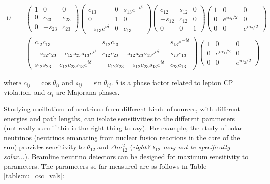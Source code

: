 \begin{equation}
\begin{aligned}
U &= \begin{pmatrix}
1 & 0 & 0 \\
0 & c_{23} & s_{23} \\
0 & -s_{23} & c_{23} \end{pmatrix}
\begin{pmatrix}
c_{13} & 0 & s_{13} e^{-i \delta} \\
0 & 1 & 0 \\
-s_{13} e^{i \delta} & 0 & c_{13} \end{pmatrix}
\begin{pmatrix}
c_{12} & s_{12} & 0 \\
-s_{12} & c_{12} & 0 \\
0 & 0 & 1 \end{pmatrix}
\begin{pmatrix}
1 & 0 & 0 \\
0 & e^{i \alpha_{1}/2} & 0 \\
0 & 0 & e^{i \alpha_{2}/2} \end{pmatrix} \\
& = \begin{pmatrix}
c_{12} c_{13} & s_{12} c_{13} & s_{13} e^{-i \delta} \\
-s_{12} c_{23} - c_{12} s_{23} s_{13} e^{i \delta} & c_{12} c_{23} - s_{12} s_{23} s_{13} e^{i \delta} & s_{23} c_{13} \\
s_{12} s_{23} - c_{12} c_{23} s_{13} e^{i \delta} & -c_{12} s_{23} - s_{12} c_{23} s_{13} e^{i \delta} & c_{23} c_{13} \end{pmatrix}
\begin{pmatrix}
1 & 0 & 0 \\
0 & e^{i \alpha_{1}/2} & 0 \\
0 & 0 & e^{i \alpha_{2}/2} \end{pmatrix}
\end{aligned}
\label{eqn:umatrix}
\end{equation}

\noindent
where $c_{ij} = \cos \theta_{ij}$ and $s_{ij} = \sin \theta_{ij}$.  $\delta$ is a phase factor related to lepton CP violation, and $\alpha_{i}$ are Majorana phases.

Studying oscillations of neutrinos from different kinds of sources, with different energies and path lengths, can isolate sensitivities to the different parameters {\color{gray}(not really sure if this is the right thing to say)}.  For example, the study of solar neutrinos (neutrinos emanating from nuclear fusion reactions in the core of the sun) provides sensitivity to $\theta_{12}$ and $\Delta m_{12}^{2}$ {\color{gray}(\emph{right? $\theta_{12}$ may not be specifically solar...})}.  Beamline neutrino detectors can be designed for maximum sensitivity to parameters.  The parameters so far measured are as follows in Table  \ref{table:nu_osc_vals}:

